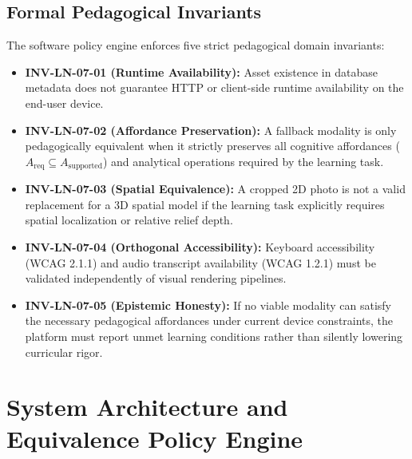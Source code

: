 \documentclass[11pt,a4paper]{article}
\begin{document}
\subsection{Formal Pedagogical Invariants}
The software policy engine enforces five strict pedagogical domain invariants:
\begin{itemize}
    \item \textbf{INV-LN-07-01 (Runtime Availability):} Asset existence in database metadata does not guarantee HTTP or client-side runtime availability on the end-user device.
    \item \textbf{INV-LN-07-02 (Affordance Preservation):} A fallback modality is only pedagogically equivalent when it strictly preserves all cognitive affordances ($A_{\text{req}} \subseteq A_{\text{supported}}$) and analytical operations required by the learning task.
    \item \textbf{INV-LN-07-03 (Spatial Equivalence):} A cropped 2D photo is not a valid replacement for a 3D spatial model if the learning task explicitly requires spatial localization or relative relief depth.
    \item \textbf{INV-LN-07-04 (Orthogonal Accessibility):} Keyboard accessibility (WCAG 2.1.1) and audio transcript availability (WCAG 1.2.1) must be validated independently of visual rendering pipelines.
    \item \textbf{INV-LN-07-05 (Epistemic Honesty):} If no viable modality can satisfy the necessary pedagogical affordances under current device constraints, the platform must report unmet learning conditions rather than silently lowering curricular rigor.
\end{itemize}

\section{System Architecture and Equivalence Policy Engine}
\end{document}
